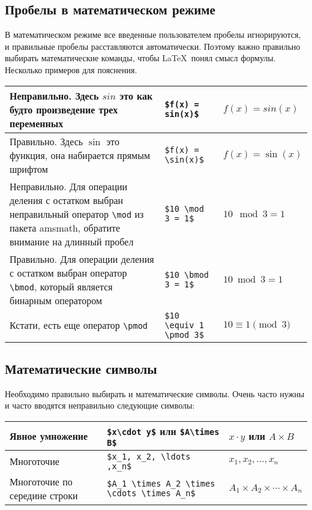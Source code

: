 \documentclass{article}
\begin{document}
    \subsection{Пробелы в математическом режиме}
    В математическом режиме все введенные пользователем пробелы игнорируются, и правильные пробелы расставляются автоматически.
    Поэтому важно правильно выбирать математические команды, чтобы \LaTeX\ понял смысл формулы.
    Несколько примеров для пояснения.

    \begin{table}[H]
        \begin{tabular}{|p{} | l  | l |}
            \hline
            Неправильно. Здесь $sin$ это как будто произведение трех переменных                                                                          & \verb|$f(x) = sin(x)$|  & $f(x) = sin(x)$  \\
            \hline
            Правильно. Здесь $\sin$ это функция, она набирается прямым шрифтом                                                                           & \verb|$f(x) = \sin(x)$| & $f(x) = \sin(x)$ \\
            \hline
            Неправильно. Для операции деления с остатком выбран неправильный оператор \verb|\mod| из пакета amsmath, обратите внимание на длинный пробел & \verb|$10 \mod 3 = 1$|  & $10 \mod 3 = 1$  \\
            \hline
            Правильно. Для операции деления с остатком выбран оператор \verb|\bmod|, который является бинарным оператором & \verb|$10 \bmod 3 = 1$| & $10 \bmod 3 = 1$ \\
            \hline
            Кстати, есть еще оператор \verb|\pmod| & \verb|$10 \equiv 1 \pmod 3$| & $10 \equiv 1 \pmod 3$ \\
            \hline
        \end{tabular}
    \end{table}

    \subsection{Математические символы}
    Необходимо правильно выбирать и математические символы. Очень часто нужны и часто вводятся неправильно следующие символы:
    \begin{table}[H]
        \begin{tabular}{|p{} | l  | l |}
            \hline
            Явное умножение & \verb|$x\cdot y$| или \verb|$A\times B$| & $x\cdot y$ или $A\times B$  \\
            \hline
            Многоточие & \verb|$x_1, x_2, \ldots ,x_n$| & $x_1, x_2, \ldots ,x_n$  \\
            \hline
            Многоточие по середине строки & \verb|$A_1 \times A_2 \times \cdots \times A_n$| & $A_1 \times A_2 \times \cdots \times A_n$  \\
            \hline
        \end{tabular}
    \end{table}
\end{document}
